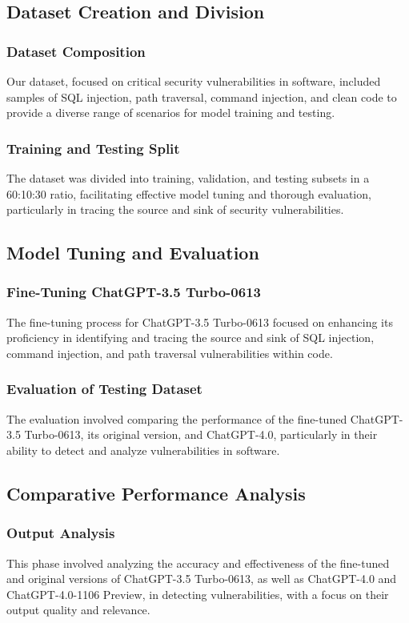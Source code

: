 \documentclass[acmsmall]{acmart}
\begin{document}
\subsection{Dataset Creation and Division}
\subsubsection{Dataset Composition}
Our dataset, focused on critical security vulnerabilities in software, included samples of SQL injection, path traversal, command injection, and clean code to provide a diverse range of scenarios for model training and testing.
\subsubsection{Training and Testing Split}
The dataset was divided into training, validation, and testing subsets in a 60:10:30 ratio, facilitating effective model tuning and thorough evaluation, particularly in tracing the source and sink of security vulnerabilities.

\subsection{Model Tuning and Evaluation}
\subsubsection{Fine-Tuning ChatGPT-3.5 Turbo-0613}
The fine-tuning process for ChatGPT-3.5 Turbo-0613 focused on enhancing its proficiency in identifying and tracing the source and sink of SQL injection, command injection, and path traversal vulnerabilities within code.
\subsubsection{Evaluation of Testing Dataset}
The evaluation involved comparing the performance of the fine-tuned ChatGPT-3.5 Turbo-0613, its original version, and ChatGPT-4.0, particularly in their ability to detect and analyze vulnerabilities in software.

\subsection{Comparative Performance Analysis}
\subsubsection{Output Analysis}
This phase involved analyzing the accuracy and effectiveness of the fine-tuned and original versions of ChatGPT-3.5 Turbo-0613, as well as ChatGPT-4.0 and ChatGPT-4.0-1106 Preview, in detecting vulnerabilities, with a focus on their output quality and relevance.
\end{document}

